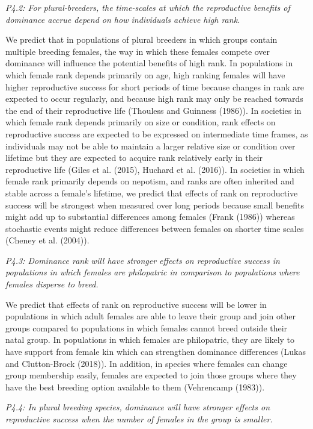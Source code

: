 \documentclass[]{article}
\begin{document}
\emph{P4.2: For plural-breeders, the time-scales at which the
reproductive benefits of dominance accrue depend on how individuals
achieve high rank.}

We predict that in populations of plural breeders in which groups
contain multiple breeding females, the way in which these females
compete over dominance will influence the potential benefits of high
rank. In populations in which female rank depends primarily on age, high
ranking females will have higher reproductive success for short periods
of time because changes in rank are expected to occur regularly, and
because high rank may only be reached towards the end of their
reproductive life (Thouless and Guinness (1986)). In societies in which
female rank depends primarily on size or condition, rank effects on
reproductive success are expected to be expressed on intermediate time
frames, as individuals may not be able to maintain a larger relative
size or condition over lifetime but they are expected to acquire rank
relatively early in their reproductive life (Giles et al. (2015),
Huchard et al. (2016)). In societies in which female rank primarily
depends on nepotism, and ranks are often inherited and stable across a
female's lifetime, we predict that effects of rank on reproductive
success will be strongest when measured over long periods because small
benefits might add up to substantial differences among females (Frank
(1986)) whereas stochastic events might reduce differences between
females on shorter time scales (Cheney et al. (2004)).

\emph{P4.3: Dominance rank will have stronger effects on reproductive
success in populations in which females are philopatric in comparison to
populations where females disperse to breed.}

We predict that effects of rank on reproductive success will be lower in
populations in which adult females are able to leave their group and
join other groups compared to populations in which females cannot breed
outside their natal group. In populations in which females are
philopatric, they are likely to have support from female kin which can
strengthen dominance differences (Lukas and Clutton-Brock (2018)). In
addition, in species where females can change group membership easily,
females are expected to join those groups where they have the best
breeding option available to them (Vehrencamp (1983)).

\emph{P4.4: In plural breeding species, dominance will have stronger
effects on reproductive success when the number of females in the group
is smaller.}
\end{document}
